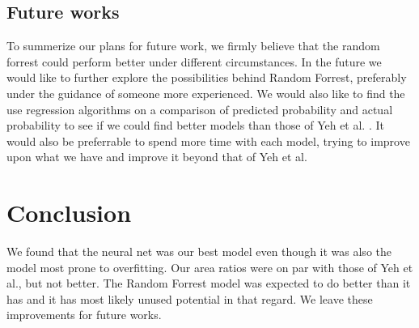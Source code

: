 \documentclass[12pt]{article}
\numberwithin{figure}{section}
\begin{document}
\subsection{Future works}
To summerize our plans for future work, we firmly believe that the random forrest could perform better under different circumstances. In the future we would like to further explore the possibilities behind Random Forrest, preferably under the guidance of someone more experienced. We would also like to find the use regression algorithms on a comparison of predicted probability and actual probability to see if we could find better models than those of Yeh et al. \cite{yeh}. It would also be preferrable to spend more time with each model, trying to improve upon what we have and improve it beyond that of Yeh et al.
\section{Conclusion}
We found that the neural net was our best model even though it was also the model most prone to overfitting. Our area ratios were on par with those of Yeh et al., but not better. The Random Forrest model was expected to do better than it has and it has most likely unused potential in that regard. We leave these improvements for future works.

\end{document}
